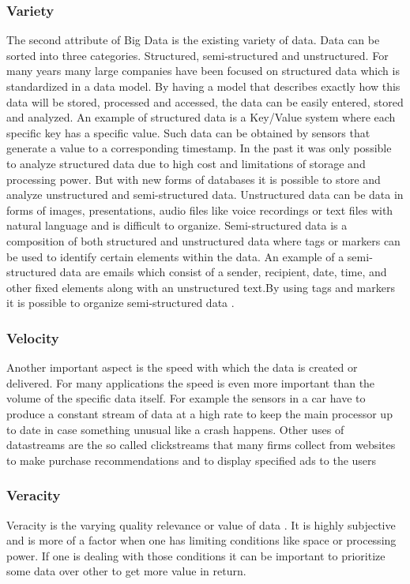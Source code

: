 \documentclass[runningheads]{llncs}
\begin{document}
\subsubsection{Variety}
The second attribute of Big Data is the existing variety of data. Data can be sorted into three categories. Structured, semi-structured and unstructured. For many years many large companies have been focused on structured data which is standardized in a data model. By having a model that describes exactly how this data will be stored, processed and accessed, the data can be easily entered, stored and analyzed. An example of structured data is a Key/Value system where each specific key has a specific value. Such data can be obtained by sensors that generate a value to a corresponding timestamp. In the past it was only possible to analyze structured data due to high cost and limitations of storage and processing power. But with new forms of databases it is possible to store and analyze unstructured and semi-structured data. Unstructured data can be data in forms of images, presentations, audio files like voice recordings or text files with natural language and is difficult to organize. Semi-structured data is a composition of both structured and unstructured data where tags or markers can be used to identify certain elements within the data. An example of a semi-structured data are emails which consist of a sender, recipient, date, time, and other fixed elements along with an unstructured text.By using tags and markers it is possible to organize semi-structured data \cite{BEAL}.

\subsubsection{Velocity}
Another important aspect is the speed with which the data is created or delivered. For many applications the speed is even more important than the volume of the specific data itself. For example the sensors in a car have to produce a constant stream of data at a high rate to keep the main processor up to date in case something unusual like a crash happens. Other uses of datastreams are the so called clickstreams that many firms collect from websites to make purchase recommendations and to display specified ads to the users \cite{RUSSOM}

\subsubsection{Veracity}
Veracity is the varying quality relevance or value of data \cite{FELDMAN}. It is highly subjective and is more of a factor when one has limiting conditions like space or processing power. If one is dealing with those conditions it can be important to prioritize some data over other to get more value in return.
\end{document}
